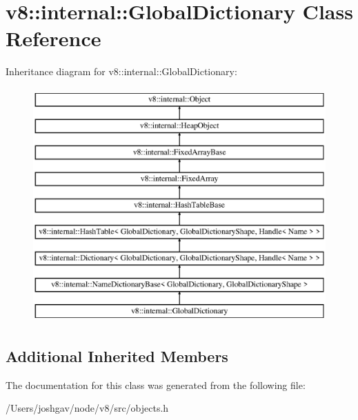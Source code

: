 \hypertarget{classv8_1_1internal_1_1_global_dictionary}{}\section{v8\+:\+:internal\+:\+:Global\+Dictionary Class Reference}
\label{classv8_1_1internal_1_1_global_dictionary}
Inheritance diagram for v8\+:\+:internal\+:\+:Global\+Dictionary\+:\begin{figure}[H]
\begin{center}
\leavevmode
\includegraphics[height=9.000000cm]{classv8_1_1internal_1_1_global_dictionary}
\end{center}
\end{figure}
\subsection*{Additional Inherited Members}


The documentation for this class was generated from the following file\+:\begin{DoxyCompactItemize}
\item 
/\+Users/joshgav/node/v8/src/objects.\+h\end{DoxyCompactItemize}
